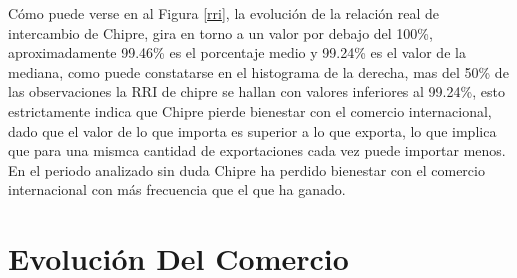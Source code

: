 \documentclass[a4paper,openright,12pt]{book}
\begin{document}
Cómo puede verse en al Figura \ref{rri}, la evolución de la relación real de intercambio de Chipre, gira en torno a un valor por debajo del 100\%, aproximadamente 99.46\% es el porcentaje medio y 99.24\% es el valor de la mediana, como puede constatarse en el histograma de la derecha, mas del 50\% de las observaciones la RRI de chipre se hallan con valores inferiores al 99.24\%, esto estrictamente indica que Chipre pierde bienestar con el comercio internacional, dado que el valor de lo que importa es superior a lo que exporta, lo que implica que para una mismca cantidad de exportaciones cada vez puede importar menos. En el periodo analizado sin duda Chipre ha perdido bienestar con el comercio internacional con más frecuencia que el que ha ganado.


\chapter{Evolución Del Comercio}
\label{cap2}
\end{document}
